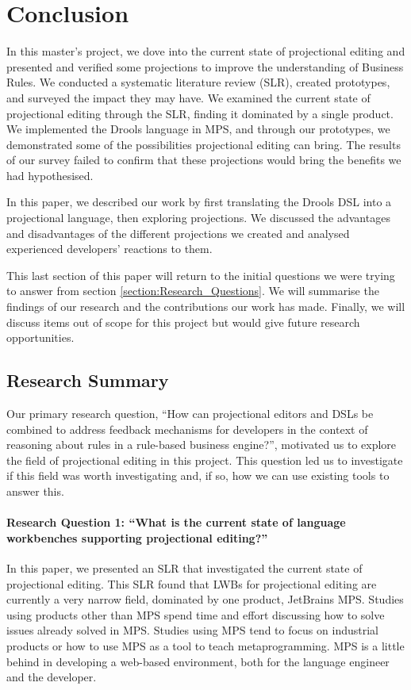 \chapter{Conclusion}
\label{chapter:Conclusion}

In this master's project, we dove into the current state of projectional editing and presented and verified some projections to improve the understanding of Business Rules.
We conducted a systematic literature review (SLR), created prototypes, and surveyed the impact they may have.
We examined the current state of projectional editing through the SLR, finding it dominated by a single product.
We implemented the Drools language in MPS, and through our prototypes, we demonstrated some of the possibilities projectional editing can bring.
The results of our survey failed to confirm that these projections would bring the benefits we had hypothesised.

In this paper, we described our work by first translating the Drools DSL into a projectional language, then exploring projections.
We discussed the advantages and disadvantages of the different projections we created and analysed experienced developers' reactions to them.

This last section of this paper will return to the initial questions we were trying to answer from section \ref{section:Research_Questions}.
We will summarise the findings of our research and the contributions our work has made.
Finally, we will discuss items out of scope for this project but would give future research opportunities.

\section{Research Summary}
Our primary research question, ``How can projectional editors and DSLs be combined to address feedback mechanisms for developers in the context of reasoning about rules in a rule-based business engine?'', motivated us to explore the field of projectional editing in this project.
This question led us to investigate if this field was worth investigating and, if so, how we can use existing tools to answer this.

\subsubsection{Research Question 1: ``What is the current state of language workbenches supporting projectional editing?''}
In this paper, we presented an SLR that investigated the current state of projectional editing.
This SLR found that LWBs for projectional editing are currently a very narrow field, dominated by one product, JetBrains MPS.
Studies using products other than MPS spend time and effort discussing how to solve issues already solved in MPS.
Studies using MPS tend to focus on industrial products or how to use MPS as a tool to teach metaprogramming.
MPS is a little behind in developing a web-based environment, both for the language engineer and the developer.

